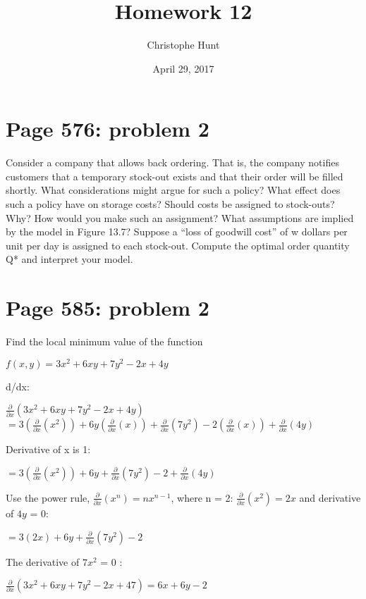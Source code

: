 \documentclass[]{article}
\title{Homework 12}
\author{Christophe Hunt}
\date{April 29, 2017}
\begin{document}
\maketitle

{
\setcounter{tocdepth}{2}
\tableofcontents
}
\section{Page 576: problem 2}\label{page-576-problem-2}

Consider a company that allows back ordering. That is, the company
notifies customers that a temporary stock-out exists and that their
order will be filled shortly. What considerations might argue for such a
policy? What effect does such a policy have on storage costs? Should
costs be assigned to stock-outs? Why? How would you make such an
assignment? What assumptions are implied by the model in Figure 13.7?
Suppose a ``loss of goodwill cost'' of w dollars per unit per day is
assigned to each stock-out. Compute the optimal order quantity Q* and
interpret your model.

\newpage

\section{Page 585: problem 2}\label{page-585-problem-2}

Find the local minimum value of the function

\(f(x,y) = 3x^2 + 6xy + 7y^2 - 2x + 4y\)

d/dx:

\(\frac{\partial}{\partial x}(3x^2 + 6xy + 7y^2 - 2x + 4y)\)\\
\(= 3(\frac{\partial}{\partial x}(x^2)) + 6y(\frac{\partial}{\partial x}(x)) + \frac{\partial}{\partial x}(7y^2) - 2 (\frac{\partial}{\partial x}(x)) + \frac{\partial}{\partial x}(4y)\)

Derivative of x is 1:

\(= 3(\frac{\partial}{\partial x}(x^2)) + 6y + \frac{\partial}{\partial x}(7y^2) - 2 + \frac{\partial}{\partial x}(4y)\)

Use the power rule, \(\frac{\partial}{\partial x}(x^n) = nx^{n-1}\),
where n = 2: \(\frac{\partial}{\partial x} (x^2)= 2x\) and derivative of
\(4y\) = 0:

\(= 3 (2x) + 6y + \frac{\partial}{\partial x}(7y^2) - 2\)

The derivative of \(7x^2\) = 0 :

\(\frac{\partial}{\partial x}(3x^2 + 6xy + 7y^2 - 2x + 47) =6x + 6y -2\)
\end{document}
